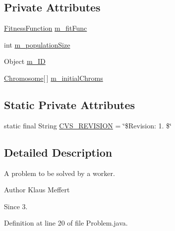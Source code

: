 \subsection*{Private Attributes}
\begin{DoxyCompactItemize}
\item 
\hyperlink{classorg_1_1jgap_1_1_fitness_function}{Fitness\-Function} \hyperlink{classorg_1_1jgap_1_1distr_1_1_problem_a417cefe25d572240b3df893c3897cfe5}{m\-\_\-fit\-Func}
\item 
int \hyperlink{classorg_1_1jgap_1_1distr_1_1_problem_a8805c7b69b526f55e738835f7a0405dc}{m\-\_\-population\-Size}
\item 
Object \hyperlink{classorg_1_1jgap_1_1distr_1_1_problem_a46336e3315d66ec68420c1d4e7ee5371}{m\-\_\-\-I\-D}
\item 
\hyperlink{classorg_1_1jgap_1_1_chromosome}{Chromosome}\mbox{[}$\,$\mbox{]} \hyperlink{classorg_1_1jgap_1_1distr_1_1_problem_aac1154b8050ba9052ad4ab0995c405df}{m\-\_\-initial\-Chroms}
\end{DoxyCompactItemize}
\subsection*{Static Private Attributes}
\begin{DoxyCompactItemize}
\item 
static final String \hyperlink{classorg_1_1jgap_1_1distr_1_1_problem_acf18bb9b4eb9f0a74ab140c8c670258f}{C\-V\-S\-\_\-\-R\-E\-V\-I\-S\-I\-O\-N} = \char`\"{}\$Revision\-: 1. \$\char`\"{}
\end{DoxyCompactItemize}


\subsection{Detailed Description}
A problem to be solved by a worker.

\begin{DoxyAuthor}{Author}
Klaus Meffert 
\end{DoxyAuthor}
\begin{DoxySince}{Since}
3. 
\end{DoxySince}


Definition at line 20 of file Problem.\-java.



